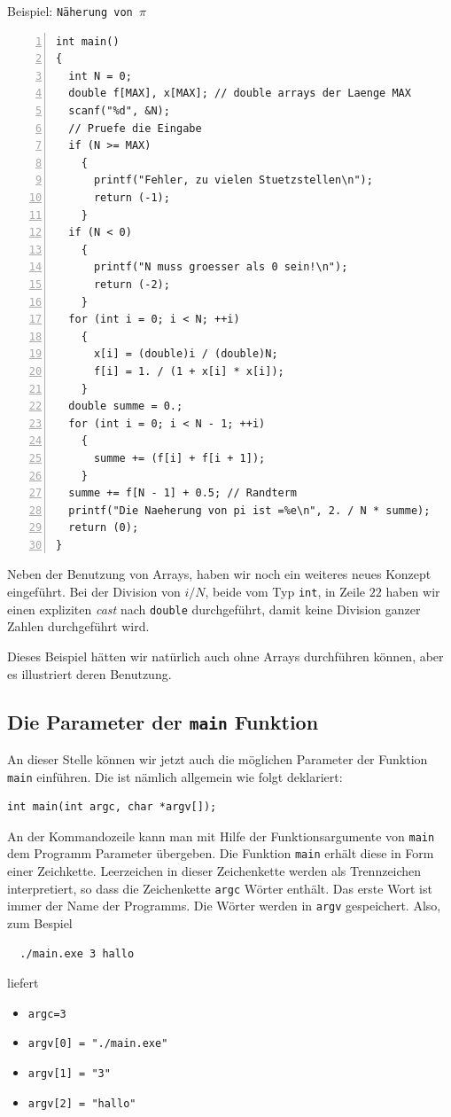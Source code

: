 \begin{myexampleprogram}{Beispiel: \texttt{Näherung von $\pi$}}
\begin{lstlisting}[numbers=left]
int main()
{
  int N = 0;
  double f[MAX], x[MAX]; // double arrays der Laenge MAX
  scanf("%d", &N);
  // Pruefe die Eingabe
  if (N >= MAX)
    {
      printf("Fehler, zu vielen Stuetzstellen\n");
      return (-1);
    }
  if (N < 0)
    {
      printf("N muss groesser als 0 sein!\n");
      return (-2);
    }
  for (int i = 0; i < N; ++i)
    {
      x[i] = (double)i / (double)N;
      f[i] = 1. / (1 + x[i] * x[i]);
    }
  double summe = 0.;
  for (int i = 0; i < N - 1; ++i)
    {
      summe += (f[i] + f[i + 1]);
    }
  summe += f[N - 1] + 0.5; // Randterm
  printf("Die Naeherung von pi ist =%e\n", 2. / N * summe);
  return (0);
}
\end{lstlisting}
  Neben der Benutzung von Arrays, haben wir noch ein weiteres neues Konzept eingeführt.
  Bei der Division von $i/N$, beide vom Typ \verb|int|, in Zeile $22$ haben wir einen expliziten \emph{cast} nach \verb|double| durchgeführt, damit keine Division ganzer Zahlen durchgeführt wird.

  Dieses Beispiel hätten wir natürlich auch ohne Arrays durchführen können, aber es illustriert deren Benutzung.
\end{myexampleprogram}

\subsection{Die Parameter der \texttt{main} Funktion} \label{subsec:CommandLineArguments}


An dieser Stelle können wir jetzt auch die möglichen Parameter der Funktion \verb|main| einführen.
Die ist nämlich allgemein wie folgt deklariert:
\begin{lstlisting}
int main(int argc, char *argv[]);
\end{lstlisting}
An der Kommandozeile kann man mit Hilfe der Funktionsargumente von \verb|main| dem Programm Parameter übergeben.
Die Funktion \verb|main| erhält diese in Form einer Zeichkette.
Leerzeichen in dieser Zeichenkette werden als Trennzeichen interpretiert, so dass die Zeichenkette \verb|argc| Wörter enthält.
Das erste Wort ist immer der Name der Programms.
Die Wörter werden in \verb|argv| gespeichert.
Also, zum Bespiel
\begin{verbatim}
  ./main.exe 3 hallo
\end{verbatim}
liefert 
\begin{itemize}
\item \verb|argc=3|
\item \verb|argv[0] = "./main.exe"|
\item \verb|argv[1] = "3"|
\item \verb|argv[2] = "hallo"|
\end{itemize}

